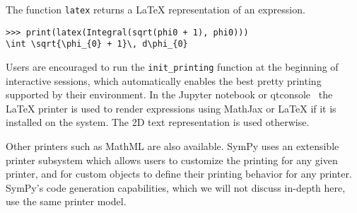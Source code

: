 The function \verb|latex| returns a \LaTeX{} representation of an expression.

\begin{verbatim}
>>> print(latex(Integral(sqrt(phi0 + 1), phi0)))
\int \sqrt{\phi_{0} + 1}\, d\phi_{0}
\end{verbatim}

Users are encouraged to run the \verb|init_printing| function at the beginning
of interactive sessions, which automatically enables the best pretty printing
supported by their environment. In the Jupyter notebook or
qtconsole~\cite{perez2007ipython} the \LaTeX{} printer is used to render
expressions using MathJax or \LaTeX{} if it is installed on the system. The 2D
text representation is used otherwise.

Other printers such as MathML are also available. SymPy uses an extensible
printer subsystem which allows users to customize the printing for any given
printer, and for custom objects to define their printing behavior for any
printer. SymPy's code generation capabilities, which we will not discuss
in-depth here, use the same printer model.
